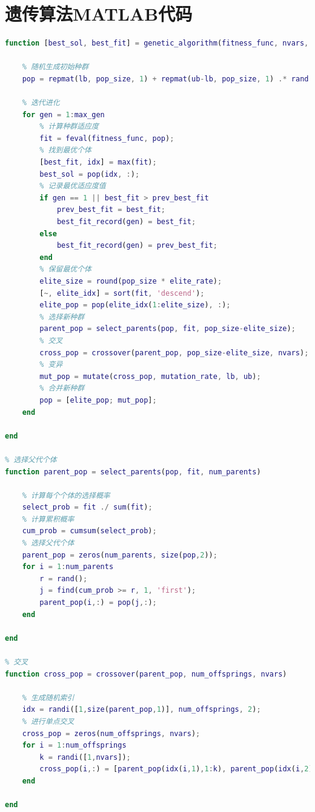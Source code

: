 \documentclass{MathorCupmodeling}
\begin{document}
\section{遗传算法MATLAB代码}
\begin{lstlisting}[language=Matlab]
% 遗传算法的主函数
function [best_sol, best_fit] = genetic_algorithm(fitness_func, nvars, lb, ub, max_gen, pop_size, elite_rate, mutation_rate)

    % 随机生成初始种群
    pop = repmat(lb, pop_size, 1) + repmat(ub-lb, pop_size, 1) .* rand(pop_size, nvars);
    
    % 迭代进化
    for gen = 1:max_gen
        % 计算种群适应度
        fit = feval(fitness_func, pop);
        % 找到最优个体
        [best_fit, idx] = max(fit);
        best_sol = pop(idx, :);
        % 记录最优适应度值
        if gen == 1 || best_fit > prev_best_fit
            prev_best_fit = best_fit;
            best_fit_record(gen) = best_fit;
        else
            best_fit_record(gen) = prev_best_fit;
        end
        % 保留最优个体
        elite_size = round(pop_size * elite_rate);
        [~, elite_idx] = sort(fit, 'descend');
        elite_pop = pop(elite_idx(1:elite_size), :);
        % 选择新种群
        parent_pop = select_parents(pop, fit, pop_size-elite_size);
        % 交叉
        cross_pop = crossover(parent_pop, pop_size-elite_size, nvars);
        % 变异
        mut_pop = mutate(cross_pop, mutation_rate, lb, ub);
        % 合并新种群
        pop = [elite_pop; mut_pop];
    end

end

% 选择父代个体
function parent_pop = select_parents(pop, fit, num_parents)

    % 计算每个个体的选择概率
    select_prob = fit ./ sum(fit);
    % 计算累积概率
    cum_prob = cumsum(select_prob);
    % 选择父代个体
    parent_pop = zeros(num_parents, size(pop,2));
    for i = 1:num_parents
        r = rand();
        j = find(cum_prob >= r, 1, 'first');
        parent_pop(i,:) = pop(j,:);
    end

end

% 交叉
function cross_pop = crossover(parent_pop, num_offsprings, nvars)

    % 生成随机索引
    idx = randi([1,size(parent_pop,1)], num_offsprings, 2);
    % 进行单点交叉
    cross_pop = zeros(num_offsprings, nvars);
    for i = 1:num_offsprings
        k = randi([1,nvars]);
        cross_pop(i,:) = [parent_pop(idx(i,1),1:k), parent_pop(idx(i,2),k+1:end)];
    end

end


\end{lstlisting}
\end{document}

